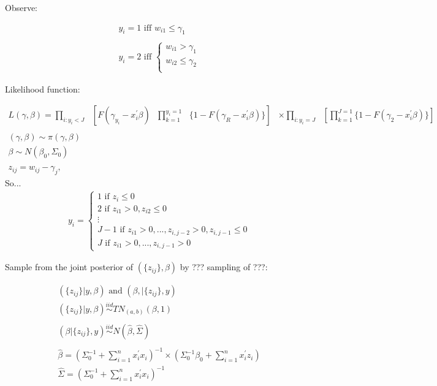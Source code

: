 Observe:

\begin{eqnarray}
	y_{i} = 1\text{ iff } w_{i1} \leq \gamma_{1} \nonumber \\
	\nonumber \\
	y_{i} = 2\text{ iff }
	\begin{cases}
	w_{i1} > \gamma_{1} \nonumber \\
	w_{i2} \leq \gamma_{2} \nonumber \\
\end{cases}
\end{eqnarray}

Likelihood function:

\begin{eqnarray}
	L(\gamma,\beta) = \prod_{i\colon y_{i}<J}\text{ }[ F(\gamma_{y_{i}} - x_{i}^{'}\beta)\text{ }\prod_{k=1}^{y_{i}=1}\text{ }\{1-F(\gamma_{R}-x_{i}^{'}\beta)\}] &\times \displaystyle \prod_{i\colon y_{i}=J}\text{ }[\prod_{k=1}^{J=1} \{1-F(\gamma_{2} - x_{i}^{'}\beta)\}] \nonumber \\
	\nonumber \\
	(\gamma,\beta) \sim \pi (\gamma,\beta) & \nonumber \\
	\beta \sim N(\beta_{0},\Sigma_{0}) & \nonumber \\
	\nonumber \\
	z_{ij} = w_{ij} - \gamma_{j}, & \nonumber
	\end{eqnarray}
	So...
	\begin{eqnarray}
	y_{i} =
	\begin{cases}
	1\text{ if }z_{i} \leq 0 \nonumber \\
	2\text{ if }z_{i1} > 0, z_{i2} \leq 0 \nonumber \\
	\vdots \nonumber \\
	J-1\text{ if }z_{i1} > 0,...,z_{i,j-2}>0,z_{i,j-1}\leq0 \nonumber \\
	J\text{ if }z_{i1}>0,...,z_{i,j-1}>0
\end{cases}
\end{eqnarray}

Sample from the joint posterior of $(\{z_{ij}\},\beta)$ by ??? sampling of ???:

\begin{eqnarray}
	(\{z_{ij}\} | y,\beta)\text{ and }(\beta,|\{z_{ij}\},y) \nonumber \\
	(\{z_{ij}\} | y,\beta)\stackrel{iid}{\sim}TN_{(a,b)}(\beta,1) \nonumber \\
	\nonumber \\
	(\beta | \{z_{ij}\},y)\stackrel{iid}{\sim}N(\hat{\beta},\hat{\Sigma}) \nonumber \\
	\nonumber \\
	\hat{\beta} = (\Sigma_{0}^{-1}+\sum_{i=1}^{n} x_{i}^{'}x_{i})^{-1} \times (\Sigma_{0}^{-1}\beta_{0}+\sum_{i=1}^{n} x_{i}^{'}z_{i}) \nonumber \\
	\hat{\Sigma} = (\Sigma_{0}^{-1} + \sum_{i=1}^{n} x_{i}^{'}x_{i})^{-1} \nonumber
\end{eqnarray}

